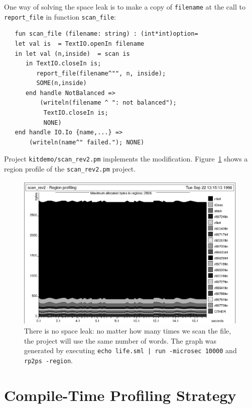 \documentclass[12pt]{book}
\begin{document}
One way of solving the space leak is to make a copy of {\tt filename}
at the call to {\tt report\_file} in function {\tt scan\_file}:
\begin{verbatim}
   fun scan_file (filename: string) : (int*int)option=
   let val is  = TextIO.openIn filename 
   in let val (n,inside)  = scan is
      in TextIO.closeIn is; 
         report_file(filename^"", n, inside);
         SOME(n,inside)
      end handle NotBalanced => 
          (writeln(filename ^ ": not balanced");
           TextIO.closeIn is;
           NONE)
   end handle IO.Io {name,...} => 
       (writeln(name^" failed."); NONE)
\end{verbatim}
Project 
%
{\tt kitdemo/scan\_rev2.pm} implements the modification.
Figure~\ref{scan_rev2_1.fig} shows a region profile of the
\texttt{scan\_rev2.pm} project.
\begin{figure}
\begin{center}
\includegraphics{scan_rev2_1.ps}
\end{center}
\caption{There is no space leak: no matter how many times we scan the
  file, the project will use the same number of words. The graph was
  generated by executing \texttt{echo life.sml | run -microsec 10000} and \texttt{rp2ps
    -region}.}
\label{scan_rev2_1.fig}
\end{figure}

\section{Compile-Time Profiling Strategy}
\end{document}

